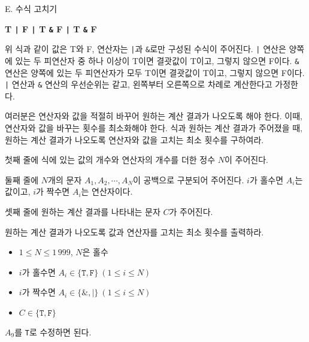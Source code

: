 \def\probtitle{수식 고치기}
\def\probno{E} %

\begin{problem}{\probno{}. \probtitle{}}

\begin{center}
    \textbf{T \texttt{|} F \texttt{|} T \texttt{\&} F \texttt{|} T \texttt{\&} F}
\end{center}

위 식과 같이 값은 T와 F, 연산자는 \texttt{|}과 \texttt{\&}로만 구성된 수식이 주어진다. \texttt{|} 연산은 양쪽에 있는 두 피연산자 중 하나 이상이 T이면 결괏값이 T이고, 그렇지 않으면 F이다. \texttt{\&} 연산은 양쪽에 있는 두 피연산자가 모두 T이면 결괏값이 T이고, 그렇지 않으면 F이다. \texttt{|} 연산과 \texttt{\&} 연산의 우선순위는 같고, 왼쪽부터 오른쪽으로 차례로 계산한다고 가정한다.

여러분은 연산자와 값을 적절히 바꾸어 원하는 계산 결과가 나오도록 해야 한다. 이때, 연산자와 값을 바꾸는 횟수를 최소화해야 한다. 식과 원하는 계산 결과가 주어졌을 때, 원하는 계산 결과가 나오도록 연산자와 값을 고치는 최소 횟수를 구하여라.

\InputFile

첫째 줄에 식에 있는 값의 개수와 연산자의 개수를 더한 정수 $N$이 주어진다.

둘째 줄에 $N$개의 문자 $A_1, A_2, \cdots, A_N$이 공백으로 구분되어 주어진다. $i$가 홀수면 $A_i$는 값이고, $i$가 짝수면 $A_i$는 연산자이다.

셋째 줄에 원하는 계산 결과를 나타내는 문자 $C$가 주어진다.

\OutputFile

원하는 계산 결과가 나오도록 값과 연산자를 고치는 최소 횟수를 출력하라.

\Constraints

\begin{itemize}[topsep=0pt,noitemsep]
    \item $1 \le N \le 1\,999$, $N$은 홀수
    \item $i$가 홀수면 $A_i \in \{\texttt{T}, \texttt{F}\}\ (1 \le i \le N)$
    \item $i$가 짝수면 $A_i \in \{\texttt{\&}, \texttt{|}\}\ (1 \le i \le N)$
    \item $C \in \{\texttt{T}, \texttt{F}\}$
\end{itemize}

\Example

\begin{example}
\end{example}

$A_9$를 \texttt{T}로 수정하면 된다.

\pagebreak

\begin{example}
\end{example}

\end{problem}